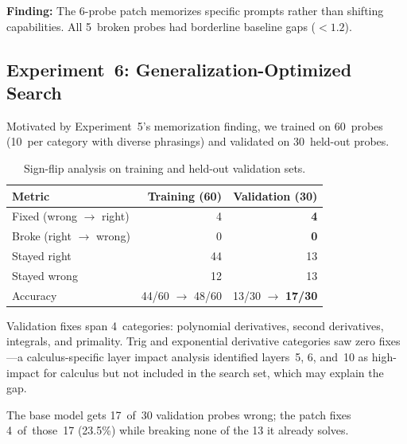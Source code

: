 \documentclass[11pt,a4paper]{article}
\begin{document}
\textbf{Finding:} The 6-probe patch memorizes specific prompts rather
than shifting capabilities. All 5~broken probes had borderline baseline
gaps ($< 1.2$).

\subsection{Experiment~6: Generalization-Optimized Search}

\noindent{}


Motivated by Experiment~5's memorization finding, we trained on
60~probes (10~per category with diverse phrasings) and validated on
30~held-out probes.

\begin{table}[h]
\centering
\caption{Sign-flip analysis on training and held-out validation sets.}
\begin{tabular}{@{}lrr@{}}
\toprule
Metric & Training (60) & Validation (30) \\
\midrule
Fixed (wrong $\to$ right) & 4 & \textbf{4} \\
Broke (right $\to$ wrong) & 0 & \textbf{0} \\
Stayed right & 44 & 13 \\
Stayed wrong & 12 & 13 \\
\midrule
Accuracy & 44/60 $\to$ 48/60 & 13/30 $\to$ \textbf{17/30} \\
\bottomrule
\end{tabular}
\end{table}

Validation fixes span 4~categories: polynomial derivatives, second
derivatives, integrals, and primality. Trig and exponential derivative
categories saw zero fixes---a calculus-specific layer impact analysis
identified layers~5, 6, and~10 as high-impact for calculus but not
included in the search set, which may explain the gap.

The base model gets 17~of~30 validation probes wrong; the patch fixes
4~of~those~17 (23.5\%) while breaking none of the 13 it already solves.
\end{document}
